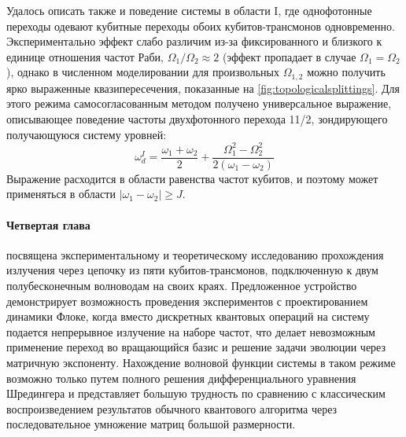 \documentclass[14pt, a4paper]{extarticle}
\begin{document}
Удалось описать также и поведение системы в области I, где однофотонные переходы одевают кубитные переходы обоих кубитов\hyp трансмонов одновременно. Экспериментально эффект слабо различим из-за фиксированного и близкого к единице отношения частот Раби, $\Omega_1/\Omega_2 \approx 2$ (эффект пропадает в случае $\Omega_1 = \Omega_2$), однако в численном моделировании для произвольных $\Omega_{1,2}$ можно получить ярко выраженные квазипересечения, показанные на \autoref{fig:topologicalsplittings}. Для этого режима самосогласованным методом получено универсальное выражение, описывающее поведение частоты двухфотонного перехода 11/2, зондирующего получающуюся систему уровней:
\begin{equation}
\omega_d^I = \frac{\omega_{1} + \omega_{2}}{2} + \frac{\Omega_{1}^{2} - \Omega_{2}^{2}}{ 2\left(\omega_{1} - \omega_{2}\right)}
\label{eq:topo_comm}
\end{equation}
Выражение расходится в области равенства частот кубитов, и поэтому может применяться в области $|\omega_1 - \omega_2| \geq J$.

\paragraph{Четвертая глава} посвящена экспериментальному и теоретическому исследованию прохождения излучения через цепочку из пяти кубитов\hyp трансмонов, подключенную к двум полубесконечным волноводам на своих краях. Предложенное устройство демонстрирует возможность проведения экспериментов с проектированием динамики Флоке, когда вместо дискретных квантовых операций на систему подается непрерывное излучение на наборе частот, что делает невозможным применение переход во вращающийся базис и решение задачи эволюции через матричную экспоненту. Нахождение волновой функции системы в таком режиме возможно только путем полного решения дифференциального уравнения Шредингера и представляет большую трудность по сравнению с классическим воспроизведением результатов обычного квантового алгоритма через последовательное умножение матриц большой размерности. 
 
\end{document}
